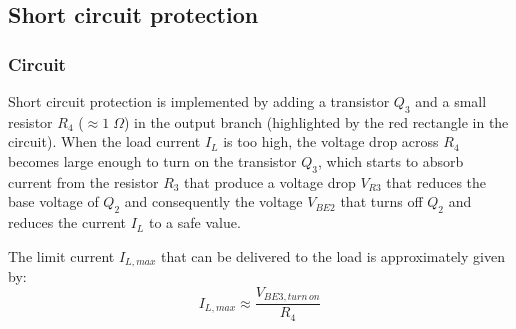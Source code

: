 \subsection{Short circuit protection}
\subsubsection*{Circuit}
Short circuit protection is implemented by adding a transistor \(Q_3\) and a small resistor \(R_4\) (\(\approx 1 \; \Omega\)) in
the output branch (highlighted by the red rectangle in the circuit). When the load current \(I_L\) is too high, the voltage drop
across \(R_4\) becomes large enough to turn on the transistor \(Q_3\), which starts to absorb current from the resistor \(R_3\)
that produce a voltage drop \(V_{R3}\) that reduces the base voltage of \(Q_2\) and consequently the voltage \(V_{BE2}\) that
turns off \(Q_2\) and reduces the current \(I_L\) to a safe value.

The limit current \(I_{L,max}\) that can be delivered to the load is approximately given by:
\[I_{L,max} \approx \frac{V_{BE3, turn \, on}}{R_4}\]

